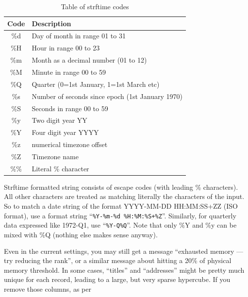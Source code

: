 \begin{table}
  \begin{tabular}{|c|l|}
    \hline Code & Description \\\hline
    \%d & Day of month in range 01 to 31\\
    \%H & Hour in range 00 to 23\\
    \%m & Month as a decimal number (01 to 12)\\
    \%M & Minute in range 00 to 59\\
    \%Q & Quarter (0=1st January, 1=1st March etc)\\
    \%s & Number of seconds since epoch (1st January 1970)\\
    \%S & Seconds in range 00 to 59 \\
    \%y & Two digit year YY\\
    \%Y & Four digit year YYYY\\
    \%z & numerical timezone offset\\
    \%Z & Timezone name\\
    \%\% & Literal \% character\\
    \hline
  \end{tabular}
  \caption{Table of strftime codes}
  \label{Strftime code}
\end{table}

Strftime formatted string consists of escape codes (with leading \%
characters). All other characters are treated as matching literally
the characters of the input. So to match a date string of the format
YYYY-MM-DD HH:MM:SS+ZZ (ISO format), use a format string
``\verb|%Y-%m-%d %H:%M:%S+%Z|''. Similarly, for quarterly data
expressed like 1972-Q1, use ``\verb+%Y-Q%Q+''. Note that only \%Y and
\%y can be mixed with \%Q (nothing else makes sense anyway).

Even in the current settings, you may still get a message ``exhausted
memory --- try reducing the rank'', or a similar message about hitting
a 20\% of physical memory threshold. In some cases, ``titles''
and ``addresses'' might be pretty much unique for each record, leading to a
large, but very sparse hypercube. If you remove those columns, as per

\begin{center}
\end{center}

